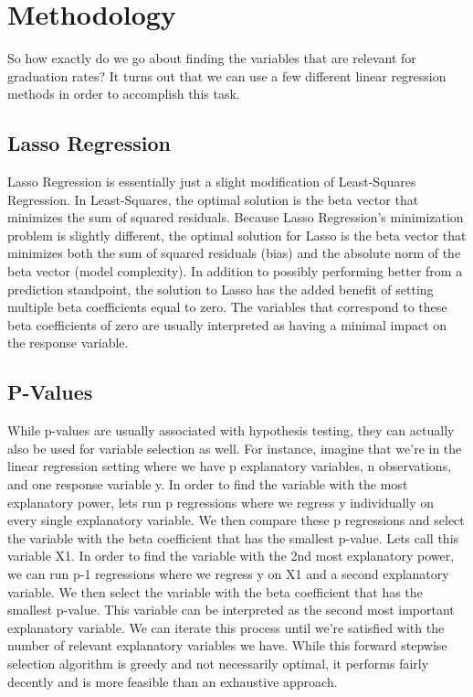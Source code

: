 \documentclass{article}
\begin{document}




\section{Methodology}

So how exactly do we go about finding the variables that are relevant for graduation rates? It turns out that we can use a few different linear regression methods in order to accomplish this task.

\subsection{Lasso Regression}
Lasso Regression is essentially just a slight modification of Least-Squares Regression. In Least-Squares, the optimal solution is the beta vector that minimizes the sum of squared residuals. Because Lasso Regression's minimization problem is slightly different, the optimal solution for Lasso is the beta vector that minimizes both the sum of squared residuals (bias) and the absolute norm of the beta vector (model complexity). In addition to possibly performing better from a prediction standpoint, the solution to Lasso has the added benefit of setting multiple beta coefficients equal to zero. The variables that correspond to these beta coefficients of zero are usually interpreted as having a minimal impact on the response variable.

\subsection{P-Values}
While p-values are usually associated with hypothesis testing, they can actually also be used for variable selection as well. For instance, imagine that we're in the linear regression setting where we have p explanatory variables, n observations, and one response variable y. In order to find the variable with the most explanatory power, lets run p regressions where we regress y individually on every single explanatory variable. We then compare these p regressions and select the variable with the beta coefficient that has the smallest p-value. Lets call this variable X1. In order to find the variable with the 2nd most explanatory power, we can run p-1 regressions where we regress y on X1 and a second explanatory variable. We then select the variable with the beta coefficient that has the smallest p-value. This variable can be interpreted as the second most important explanatory variable. We can iterate this process until we're satisfied with the number of relevant explanatory variables we have. While this forward stepwise selection algorithm is greedy and not necessarily optimal, it performs fairly decently and is more feasible than an exhaustive approach.
\end{document}
